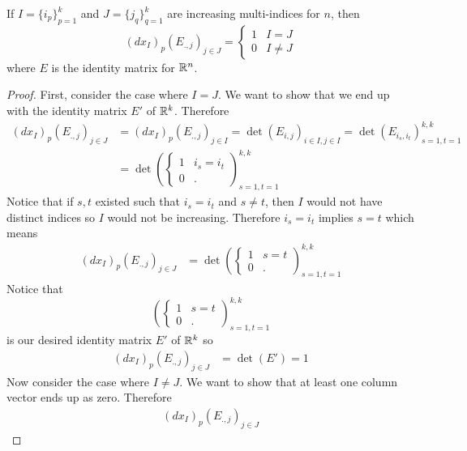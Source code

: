 \documentclass[notes]{subfiles}
\begin{document}
\begin{theorem} \label{nonzero_thm}
    If $I = \{i_p\}_{p = 1}^k$ and $J = \{j_q\}_{q = 1}^k$ are increasing multi-indices for $n$, then
    \[
        (dx_I)_p(E_{., j})_{j \in J} = \begin{cases}
            1 & I = J \\
            0 & I \neq J
        \end{cases}
    \]
    where $E$ is the identity matrix for $\mathbb{R}^n$.
\end{theorem}
\begin{proof}
    First, consider the case where $I = J$. We want to show that we end up with the identity matrix $E'$ of $\mathbb{R}^k$. Therefore
    \begin{align*}
        (dx_I)_p(E_{., j})_{j \in J}
        &= (dx_I)_p(E_{., j})_{j \in I}
        = \det(E_{i, j})_{i \in I, j \in I}
        = \det(E_{i_s, i_t})_{s = 1, t = 1}^{k, k} \\
        &= \det\left(\begin{cases}
            1 & i_s = i_t \\
            0 & .
        \end{cases}\right)_{s = 1, t = 1}^{k, k}
    \end{align*}
    Notice that if $s, t$ existed such that $i_s = i_t$ and $s \neq t$, then $I$ would not have distinct indices so $I$ would not be increasing. Therefore $i_s = i_t$ implies $s = t$ which means
    \begin{align*}
        (dx_I)_p(E_{., j})_{j \in J}
        &= \det\left(\begin{cases}
            1 & s = t \\
            0 & .
        \end{cases}\right)_{s = 1, t = 1}^{k, k}
    \end{align*}
    Notice that \[
        \left(\begin{cases}
            1 & s = t \\
            0 & .
        \end{cases}\right)_{s = 1, t = 1}^{k, k}
    \]
    is our desired identity matrix $E'$ of $\mathbb{R}^k$ so
    \begin{align*}
        (dx_I)_p(E_{., j})_{j \in J}
        &= \det(E')
        = 1
    \end{align*}
    Now consider the case where $I \neq J$. We want to show that at least one column vector ends up as zero. Therefore
    \begin{align*}
        (dx_I)_p(E_{., j})_{j \in J}

\end{align*}
\end{proof}
\end{document}
